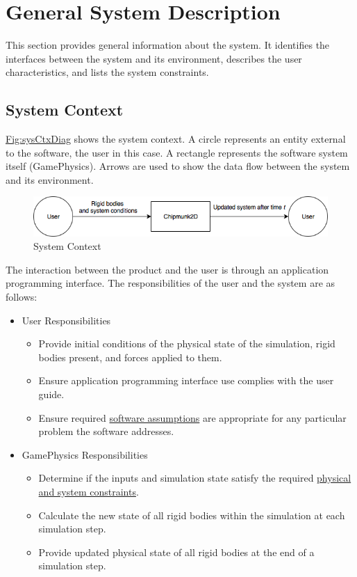 \documentclass[12pt]{article}
\begin{document}
\section{General System Description}
\label{Sec:GenSysDesc}
This section provides general information about the system. It identifies the interfaces between the system and its environment, describes the user characteristics, and lists the system constraints.

\subsection{System Context}
\label{Sec:SysContext}
\hyperref[Figure:sysCtxDiag]{Fig:sysCtxDiag} shows the system context. A circle represents an entity external to the software, the user in this case. A rectangle represents the software system itself (GamePhysics). Arrows are used to show the data flow between the system and its environment.

\begin{figure}
\begin{center}
\includegraphics[width=\textwidth]{../../../../datafiles/gamephysics/sysctx.png}
\caption{System Context}
\label{Figure:sysCtxDiag}
\end{center}
\end{figure}
The interaction between the product and the user is through an application programming interface. The responsibilities of the user and the system are as follows:

\begin{itemize}
\item{User Responsibilities}
\begin{itemize}
\item{Provide initial conditions of the physical state of the simulation, rigid bodies present, and forces applied to them.}
\item{Ensure application programming interface use complies with the user guide.}
\item{Ensure required \hyperref[Sec:Assumps]{software assumptions} are appropriate for any particular problem the software addresses.}
\end{itemize}
\item{GamePhysics Responsibilities}
\begin{itemize}
\item{Determine if the inputs and simulation state satisfy the required \hyperref[Sec:DataConstraints]{physical and system constraints}.}
\item{Calculate the new state of all rigid bodies within the simulation at each simulation step.}
\item{Provide updated physical state of all rigid bodies at the end of a simulation step.}
\end{itemize}
\end{itemize}
\end{document}
